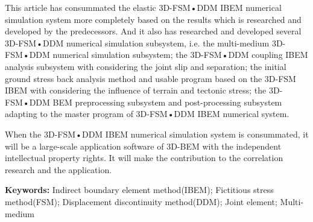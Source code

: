 This article has consummated the elastic 3D-FSM•DDM IBEM numerical simulation system more completely based on the results which is researched and developed by the predecessors. And it also has researched and developed several 3D-FSM•DDM numerical simulation subsystem, i.e. the multi-medium 3D-FSM•DDM numerical simulation subsystem; the 3D-FSM•DDM coupling IBEM analysis subsystem with considering the joint slip and separation; the initial ground stress back analysis method and usable program based on the 3D-FSM IBEM with considering the influence of terrain and tectonic stress; the 3D-FSM•DDM BEM preprocessing subsystem and post-processing subsystem adapting to the master program of 3D-FSM•DDM IBEM numerical system.

When the 3D-FSM•DDM IBEM numerical simulation system is consummated, it will be a large-scale application software of 3D-BEM with the independent intellectual property rights. It will make the contribution to the correlation research and the application.

{\bfseries {Keywords:}} Indirect boundary element method(IBEM); Fictitious stress method(FSM); Displacement discontinuity method(DDM); Joint element; Multi-medium

\clearpage

